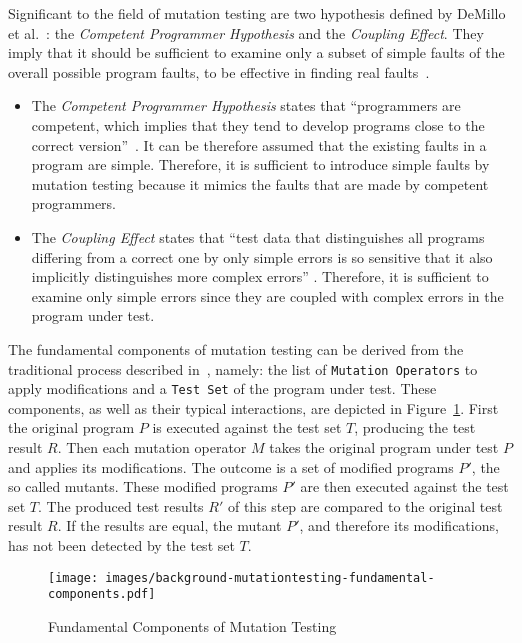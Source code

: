 Significant to the field of mutation testing are two hypothesis defined by DeMillo et al.~\cite{demillo1978hints}: the \emph{Competent Programmer Hypothesis} and the \emph{Coupling Effect}. They imply that it should be sufficient to examine only a subset of simple faults of the overall possible program faults, to be effective in finding real faults~\cite{jia2011analysis}.
\begin{itemize}
\item The \emph{Competent Programmer Hypothesis} states that \enquote{programmers are competent, which implies that they tend to develop programs close to the correct version}~\cite{jia2011analysis}. It can be therefore assumed that the existing faults in a program are simple. Therefore, it is sufficient to introduce simple faults by mutation testing because it mimics the faults that are made by competent programmers.
\item The \emph{Coupling Effect} states that \enquote{test data that distinguishes all programs differing from a correct one by only simple errors is so sensitive that it also implicitly distinguishes more complex errors} \cite{demillo1978hints}. Therefore, it is sufficient to examine only simple errors since they are coupled with complex errors in the program under test.
\end{itemize}

The fundamental components of mutation testing can be derived from the traditional process described in~\cite{demillo1978hints, jia2011analysis}, namely: the list of \texttt{Mutation Operators} to apply modifications and a \texttt{Test Set} of the program under test. These components, as well as their typical interactions, are depicted in Figure~\ref{fig:backgroundMutationTestingFundamentalComponents}. First the original program $P$ is executed against the test set $T$, producing the test result $R$. Then each mutation operator $M$ takes the original program under test $P$ and applies its modifications. The outcome is a set of modified programs $P'$, the so called mutants. These modified programs $P'$ are then executed against the test set $T$. The produced test results $R'$ of this step are compared to the original test result $R$. If the results are equal, the mutant $P'$, and therefore its modifications, has not been detected by the test set $T$.

\begin{figure}[t]
\texttt{[image: images/background-mutationtesting-fundamental-components.pdf]}
\caption{Fundamental Components of Mutation Testing}
\label{fig:backgroundMutationTestingFundamentalComponents}
\end{figure}

